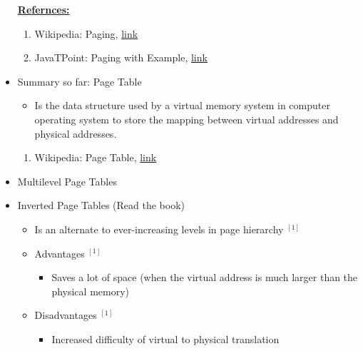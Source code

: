 \documentclass[12pt]{article}
\begin{document}
\begin{itemize}
    \bigskip

    \underline{\textbf{Refernces:}}

    \bigskip

    \begin{enumerate}[1)]
        \item Wikipedia: Paging, \href{https://en.wikipedia.org/wiki/Paging}{link}
        \item JavaTPoint: Paging with Example, \href{https://www.javatpoint.com/os-paging-with-example}{link}
    \end{enumerate}
    \item Summary so far: Page Table
    \begin{itemize}
        \item Is the data structure used by a virtual memory system in computer
        operating system to store the mapping between virtual addresses and physical
        addresses.
    \end{itemize}

    \bigskip

    \begin{enumerate}[1)]
        \item Wikipedia: Page Table, \href{https://en.wikipedia.org/wiki/Page_table}{link}
    \end{enumerate}
    \item Multilevel Page Tables
    \item Inverted Page Tables (Read the book)
    \begin{itemize}
        \item Is an alternate to ever-increasing levels in page hierarchy $^{[1]}$
        \item Advantages $^{[1]}$
        \begin{itemize}
            \item Saves a lot of space (when the virtual address is much larger
            than the physical memory)
        \end{itemize}
        \item Disadvantages $^{[1]}$
        \begin{itemize}
            \item Increased difficulty of virtual to physical translation
        \end{itemize}
    \end{itemize}


\end{itemize}
\end{document}
